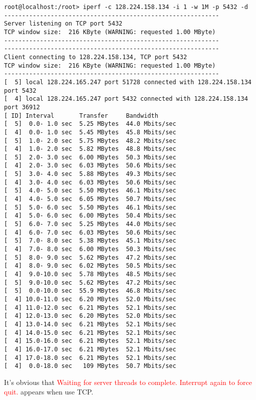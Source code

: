 \documentclass[a4paper]{report}
\begin{document}
\begin{lstlisting}
root@localhost:/root> iperf -c 128.224.158.134 -i 1 -w 1M -p 5432 -d
------------------------------------------------------------
Server listening on TCP port 5432
TCP window size:  216 KByte (WARNING: requested 1.00 MByte)
------------------------------------------------------------
------------------------------------------------------------
Client connecting to 128.224.158.134, TCP port 5432
TCP window size:  216 KByte (WARNING: requested 1.00 MByte)
------------------------------------------------------------
[  5] local 128.224.165.247 port 51728 connected with 128.224.158.134 port 5432
[  4] local 128.224.165.247 port 5432 connected with 128.224.158.134 port 36912
[ ID] Interval       Transfer     Bandwidth
[  5]  0.0- 1.0 sec  5.25 MBytes  44.0 Mbits/sec
[  4]  0.0- 1.0 sec  5.45 MBytes  45.8 Mbits/sec
[  5]  1.0- 2.0 sec  5.75 MBytes  48.2 Mbits/sec
[  4]  1.0- 2.0 sec  5.82 MBytes  48.8 Mbits/sec
[  5]  2.0- 3.0 sec  6.00 MBytes  50.3 Mbits/sec
[  4]  2.0- 3.0 sec  6.03 MBytes  50.6 Mbits/sec
[  5]  3.0- 4.0 sec  5.88 MBytes  49.3 Mbits/sec
[  4]  3.0- 4.0 sec  6.03 MBytes  50.6 Mbits/sec
[  5]  4.0- 5.0 sec  5.50 MBytes  46.1 Mbits/sec
[  4]  4.0- 5.0 sec  6.05 MBytes  50.7 Mbits/sec
[  5]  5.0- 6.0 sec  5.50 MBytes  46.1 Mbits/sec
[  4]  5.0- 6.0 sec  6.00 MBytes  50.4 Mbits/sec
[  5]  6.0- 7.0 sec  5.25 MBytes  44.0 Mbits/sec
[  4]  6.0- 7.0 sec  6.03 MBytes  50.6 Mbits/sec
[  5]  7.0- 8.0 sec  5.38 MBytes  45.1 Mbits/sec
[  4]  7.0- 8.0 sec  6.00 MBytes  50.3 Mbits/sec
[  5]  8.0- 9.0 sec  5.62 MBytes  47.2 Mbits/sec
[  4]  8.0- 9.0 sec  6.02 MBytes  50.5 Mbits/sec
[  4]  9.0-10.0 sec  5.78 MBytes  48.5 Mbits/sec
[  5]  9.0-10.0 sec  5.62 MBytes  47.2 Mbits/sec
[  5]  0.0-10.0 sec  55.9 MBytes  46.8 Mbits/sec
[  4] 10.0-11.0 sec  6.20 MBytes  52.0 Mbits/sec
[  4] 11.0-12.0 sec  6.21 MBytes  52.1 Mbits/sec
[  4] 12.0-13.0 sec  6.20 MBytes  52.0 Mbits/sec
[  4] 13.0-14.0 sec  6.21 MBytes  52.1 Mbits/sec
[  4] 14.0-15.0 sec  6.21 MBytes  52.1 Mbits/sec
[  4] 15.0-16.0 sec  6.21 MBytes  52.1 Mbits/sec
[  4] 16.0-17.0 sec  6.21 MBytes  52.1 Mbits/sec
[  4] 17.0-18.0 sec  6.21 MBytes  52.1 Mbits/sec
[  4]  0.0-18.0 sec   109 MBytes  50.7 Mbits/sec
\end{lstlisting}
It's obvious that \textcolor{red}{Waiting for server threads to complete. Interrupt again to force quit.}
appears when use TCP. 
\end{document}
